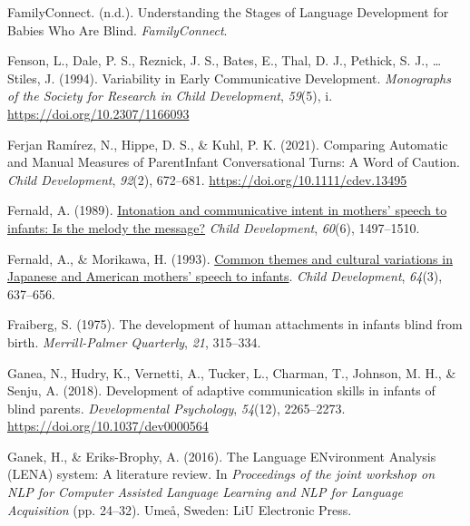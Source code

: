 \documentclass[
  man]{apa6}
\newlength{\cslhangindent}
\newlength{\cslentryspacingunit} %
\newenvironment{CSLReferences}[2] %
 {%
  \setlength{\parindent}{0pt}
  \ifodd #1
  \let\oldpar\par
  \def\par{\hangindent=\cslhangindent\oldpar}
  \fi
  \setlength{\parskip}{#2\cslentryspacingunit}
 }%
 {}
\begin{document}
\begin{CSLReferences}{1}{0}
\leavevmode{}%
FamilyConnect. (n.d.). Understanding the {Stages} of {Language Development} for {Babies Who Are Blind}. \emph{FamilyConnect}.

\leavevmode{}%
Fenson, L., Dale, P. S., Reznick, J. S., Bates, E., Thal, D. J., Pethick, S. J., \ldots{} Stiles, J. (1994). Variability in {Early Communicative Development}. \emph{Monographs of the Society for Research in Child Development}, \emph{59}(5), i. \url{https://doi.org/10.2307/1166093}

\leavevmode{}%
Ferjan Ramírez, N., Hippe, D. S., \& Kuhl, P. K. (2021). Comparing {Automatic} and {Manual Measures} of {Parent}{\textendash}{Infant Conversational Turns}: {A Word} of {Caution}. \emph{Child Development}, \emph{92}(2), 672--681. \url{https://doi.org/10.1111/cdev.13495}

\leavevmode{}%
Fernald, A. (1989). \href{https://www.ncbi.nlm.nih.gov/pubmed/2612255}{Intonation and communicative intent in mothers' speech to infants: Is the melody the message?} \emph{Child Development}, \emph{60}(6), 1497--1510.

\leavevmode{}%
Fernald, A., \& Morikawa, H. (1993). \href{https://www.ncbi.nlm.nih.gov/pubmed/8339686}{Common themes and cultural variations in {Japanese} and {American} mothers' speech to infants}. \emph{Child Development}, \emph{64}(3), 637--656.

\leavevmode{}%
Fraiberg, S. (1975). The development of human attachments in infants blind from birth. \emph{Merrill-Palmer Quarterly}, \emph{21}, 315--334.

\leavevmode{}%
Ganea, N., Hudry, K., Vernetti, A., Tucker, L., Charman, T., Johnson, M. H., \& Senju, A. (2018). Development of adaptive communication skills in infants of blind parents. \emph{Developmental Psychology}, \emph{54}(12), 2265--2273. \url{https://doi.org/10.1037/dev0000564}

\leavevmode{}%
Ganek, H., \& Eriks-Brophy, A. (2016). The {Language ENvironment Analysis} ({LENA}) system: {A} literature review. In \emph{Proceedings of the joint workshop on {NLP} for {Computer Assisted Language Learning} and {NLP} for {Language Acquisition}} (pp. 24--32). {Ume{å}, Sweden}: {LiU Electronic Press}.


\end{CSLReferences}
\end{document}
